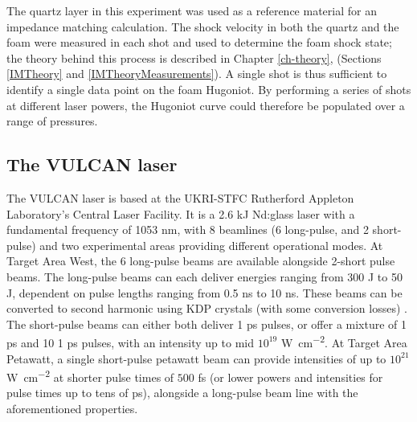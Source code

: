 The quartz layer in this experiment was used as a reference material for an impedance matching calculation. The shock velocity in both the quartz and the foam were measured in each shot and used to determine the foam shock state; the theory behind this process is described in Chapter \ref{ch-theory}, (Sections \ref{IMTheory} and \ref{IMTheoryMeasurements}). A single shot is thus sufficient to identify a single data point on the foam Hugoniot. By performing a series of shots at different laser powers, the Hugoniot curve could therefore be populated over a range of pressures.

\subsection{The VULCAN laser}

The VULCAN laser is based at the UKRI-STFC Rutherford Appleton Laboratory's Central Laser Facility. It is a 2.6 kJ Nd:glass laser with a fundamental frequency of 1053 \unit{\nano\meter}, with 8 beamlines (6 long-pulse, and 2 short-pulse) and two experimental areas providing different operational modes. At Target Area West, the 6 long-pulse beams are available alongside 2-short pulse beams. The long-pulse beams can each deliver energies ranging from 300 \unit{\joule} to 50 \unit{\joule}, dependent on pulse lengths ranging from 0.5 \unit{\nano\second} to 10 \unit{\nano\second}. These beams can be converted to second harmonic using KDP crystals (with some conversion losses) \cite{Ross1981}. The short-pulse beams can either both deliver 1 \unit{\pico\second} pulses, or offer a mixture of 1 \unit{\pico\second} and 10 1 \unit{\pico\second} pulses, with an intensity up to mid $10^{19}$ \unit{\watt\per\centi\meter\squared}. At Target Area Petawatt, a single short-pulse petawatt beam can provide intensities of up to $10^{21}$ \unit{\watt\per\centi\meter\squared} at shorter pulse times of $500$ \unit{\femto\second} (or lower powers and intensities for pulse times up to tens of \unit{\pico\second}), alongside a long-pulse beam line with the aforementioned properties.

